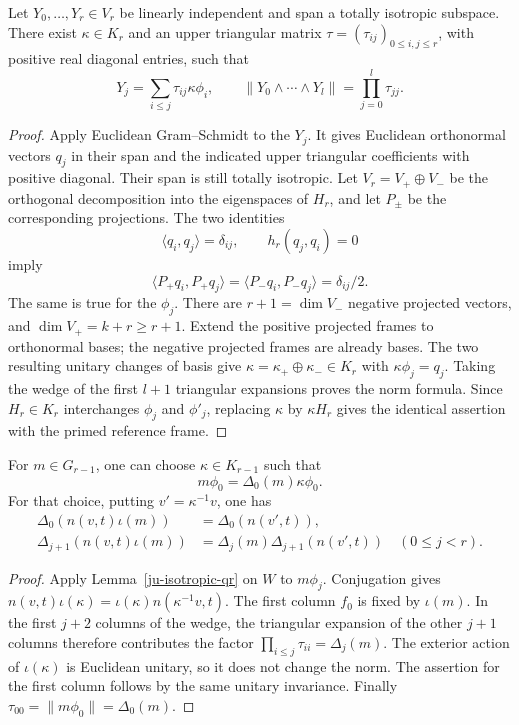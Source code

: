 \begin{lemma}\label{ju-isotropic-qr}
Let \(Y_0,\ldots,Y_r\in V_r\) be linearly independent and
span a totally isotropic subspace.  There exist
\(\kappa\in K_r\) and an upper triangular matrix
\(\tau=(\tau_{ij})_{0\leq i,j\leq r}\), with positive real
diagonal entries, such that
\[
 Y_j=\sum_{i\leq j}\tau_{ij}\kappa\phi_i,\qquad
 \|Y_0\wedge\cdots\wedge Y_l\|
                            =\prod_{j=0}^{l}\tau_{jj}.
\]
\end{lemma}

\begin{proof}
Apply Euclidean Gram--Schmidt to the \(Y_j\).
It gives Euclidean orthonormal vectors \(q_j\) in their span
and the indicated upper triangular coefficients with positive
diagonal.  Their span is still totally isotropic.
Let \(V_r=V_+\oplus V_-\) be the orthogonal decomposition
into the eigenspaces of \(H_r\), and let \(P_\pm\) be the
corresponding projections.  The two identities
\[
 \langle q_i,q_j\rangle=\delta_{ij},\qquad h_r(q_j,q_i)=0
\]
imply
\[
 \langle P_+q_i,P_+q_j\rangle
   =\langle P_-q_i,P_-q_j\rangle=\delta_{ij}/2.
\]
The same is true for the \(\phi_j\).
There are \(r+1=\dim V_-\) negative projected vectors,
and \(\dim V_+=k+r\geq r+1\).
Extend the positive projected frames to orthonormal bases;
the negative projected frames are already bases.
The two resulting unitary changes of basis give
\(\kappa=\kappa_+\oplus\kappa_-\in K_r\) with
\(\kappa\phi_j=q_j\).
Taking the wedge of the first \(l+1\) triangular expansions
proves the norm formula.
Since \(H_r\in K_r\) interchanges \(\phi_j\) and \(\phi'_j\),
replacing \(\kappa\) by \(\kappa H_r\) gives the identical
assertion with the primed reference frame.
\end{proof}

\begin{lemma}\label{ju-levi-factor}
For \(m\in G_{r-1}\), one can choose
\(\kappa\in K_{r-1}\) such that
\[
 m\phi_0=\Delta_0(m)\kappa\phi_0 .
\]
For that choice, putting \(v'=\kappa^{-1}v\), one has
\begin{align}
 \Delta_0(n(v,t)\iota(m))&=\Delta_0(n(v',t)),\nonumber\\
 \Delta_{j+1}(n(v,t)\iota(m))
     &=\Delta_j(m)\Delta_{j+1}(n(v',t))
                                    \quad(0\leq j<r).
 \label{ju-levi-norms}
\end{align}
\end{lemma}

\begin{proof}
Apply Lemma~\ref{ju-isotropic-qr} on \(W\) to \(m\phi_j\).
Conjugation gives
\(n(v,t)\iota(\kappa)=\iota(\kappa)n(\kappa^{-1}v,t)\).
The first column \(f_0\) is fixed by \(\iota(m)\).
In the first \(j+2\) columns of the wedge, the triangular
expansion of the other \(j+1\) columns therefore contributes
the factor \(\prod_{i\leq j}\tau_{ii}=\Delta_j(m)\).
The exterior action of \(\iota(\kappa)\) is Euclidean unitary,
so it does not change the norm.
The assertion for the first column follows by the same
unitary invariance.  Finally
\(\tau_{00}=\|m\phi_0\|=\Delta_0(m)\).
\end{proof}

